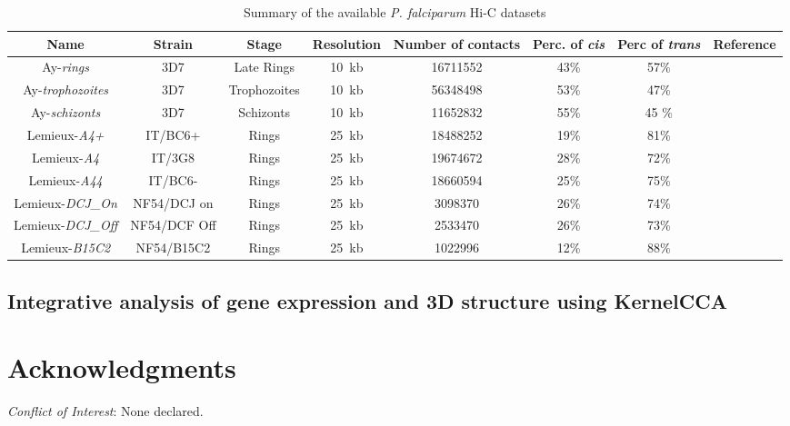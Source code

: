 \documentclass[letterpaper,12pt]{article}
\begin{document}
\begin{table}
\scriptsize
\centering
\begin{tabular}{cccccccc}
\hline
\textbf{Name} & \textbf{Strain} & \textbf{Stage} & \textbf{Resolution} &
\textbf{Number of contacts} & \textbf{Perc. of \textit{cis}} & \textbf{Perc of
\textit{trans}}& \textbf{Reference} \\
\hline
\hline
Ay-\textit{rings} & 3D7 & Late Rings & 10~kb & 16711552 & 43\% & 57\% &  \cite{ay:three-dimensional} \\
Ay-\textit{trophozoites} & 3D7 & Trophozoites &10~kb & 56348498 & 53\% & 47\% & \cite{ay:three-dimensional} \\
Ay-\textit{schizonts} & 3D7 & Schizonts & 10~kb & 11652832 & 55\% & 45 \% & \cite{ay:three-dimensional} \\
Lemieux-\textit{A4+} & IT/BC6+ & Rings & 25~kb & 18488252 & 19\% & 81\% & \cite{lemieux:genome-wide} \\
Lemieux-\textit{A4} & IT/3G8 & Rings &  25~kb & 19674672 & 28\% & 72\% & \cite{lemieux:genome-wide}\\
Lemieux-\textit{A44} & IT/BC6- & Rings & 25~kb & 18660594 & 25\% & 75\% & \cite{lemieux:genome-wide}\\
Lemieux-\textit{DCJ\_On} & NF54/DCJ on & Rings & 25~kb & 3098370 & 26\% & 74\% &\cite{lemieux:genome-wide} \\
Lemieux-\textit{DCJ\_Off} & NF54/DCF Off & Rings & 25~kb & 2533470 & 26\% & 73\% &\cite{lemieux:genome-wide} \\
Lemieux-\textit{B15C2} & NF54/B15C2 & Rings & 25~kb &  1022996 & 12\% & 88\% & \cite{lemieux:genome-wide}\\
\hline
\end{tabular}
\caption{Summary of the available {\em P. falciparum} Hi-C datasets}
\end{table}

\subsection*{Integrative analysis of gene expression and 3D structure using KernelCCA}



\section*{Acknowledgments}

{\it Conflict of Interest}: None declared.






\begin{figure}[!p]
\centering
\caption{}
\label{Fig1}
\end{figure}
\end{document}
